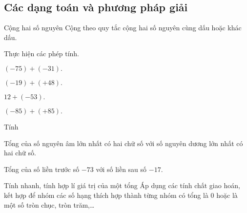 \subsection{Các dạng toán và phương pháp giải}
\begin{dang}{Cộng hai số nguyên}
Cộng theo quy tắc cộng hai số nguyên cùng dấu hoặc khác dấu.
\end{dang}
\begin{vd}%
Thực hiện các phép tính.
\begin{enumEX}{2}
	\item $(-75) +(-31).$
	\item $(-19) + (+48).$
	\item $12 +(-53).$
	\item $(-85) + (+85).$
\end{enumEX}
\end{vd}
\begin{vd}%
Tính
\begin{enumEX}{1}
		\item Tổng của số nguyên âm lớn nhất có hai chữ số với số nguyên dương lớn nhất có hai chữ số.
	\item Tổng của số liền trước số $-73$ với số liền sau số $-17$.
\end{enumEX}
\end{vd}
\begin{dang}{Tính nhanh, tính hợp lí giá trị của một tổng}
	Áp dụng các tính chất giao hoán, kết hợp để nhóm các số hạng thích hợp thành từng nhóm có tổng là $0$ hoặc là một số tròn chục, tròn trăm,\ldots
	\end{dang}
